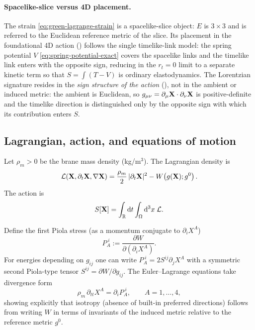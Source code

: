 \paragraph{Spacelike-slice versus 4D placement.}
The strain \eqref{eq:green-lagrange-strain} is a spacelike-slice object: $E$ is $3\times 3$
and is referred to the Euclidean reference metric of the slice.
Its placement in the foundational 4D action () follows the
single timelike-link model: the spring potential $V$ \eqref{eq:spring-potential-exact} covers
the spacelike links and the timelike link enters with the opposite sign, reducing in the
$r_t=0$ limit to a separate kinetic term so that $S=\int(T-V)$ is ordinary elastodynamics.
The Lorentzian signature resides in the \emph{sign structure of the action}
(), not in the ambient or induced metric: the ambient is
Euclidean, so $g_{\mu\nu}=\partial_\mu\mathbf{X}\cdot\partial_\nu\mathbf{X}$ is positive-definite and
the timelike direction is distinguished only by the opposite sign with which its contribution
enters $S$.

\subsection{Lagrangian, action, and equations of motion}

Let $\rho_m>0$ be the brane mass density (kg/m$^3$). The Lagrangian density is
\begin{equation}
  \mathcal{L}(\mathbf{X},\partial_t\mathbf{X},\nabla\mathbf{X})
  =\frac{\rho_m}{2}\,|\partial_t\mathbf{X}|^2
  -W\!\left(g(\mathbf{X});g^0\right).
  \label{eq:lagrangian-density}
\end{equation}
The action is
\begin{equation}
  S[\mathbf{X}] = \int_{\mathbb{R}}\mathrm{d} t \int_{\Omega} \mathrm{d}^3 x\;\mathcal{L}.
  \label{eq:action}
\end{equation}

Define the first Piola stress (as a momentum conjugate to $\partial_i X^A$)
\begin{equation}
  P_A^{\;i} := \frac{\partial W}{\partial(\partial_i X^A)}.
  \label{eq:piola-def}
\end{equation}
For energies depending on $g_{ij}$ one can write $P_A^{\;i}=2S^{ij}\partial_j X^A$ with a symmetric
second Piola-type tensor $S^{ij}=\partial W/\partial g_{ij}$.
The Euler--Lagrange equations take divergence form
\begin{equation}
  \rho_m\,\partial_{tt} X^A = \partial_i P_A^{\;i},
  \qquad A=1,\dots,4,
  \label{eq:eom}
\end{equation}
showing explicitly that isotropy (absence of built-in preferred directions) follows from writing
$W$ in terms of invariants of the induced metric relative to the reference metric $g^0$.


